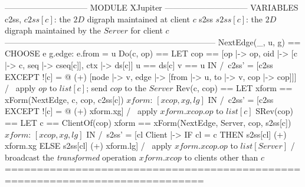 \documentclass[preview, border={5pt 0pt 5pt 1pt}]{standalone}
\begin{document}
\begin{tla}
------------------------------ MODULE XJupiter ------------------------------
VARIABLES c2ss, \* $c2ss[c]$: the $2D$ digraph maintained at client $c$ 
          s2ss  \* $s2ss[c]$: the $2D$ digraph maintained by the $Server$ for client $c$
-----------------------------------------------------------------------------
NextEdge(_, u, g) == CHOOSE e \in g.edge: e.from = u
Do(c, op) == LET cop == [op |-> op, oid |-> [c |-> c, seq |-> cseq[c]], ctx |-> ds[c]]
                   u == ds[c]    v == u 
             IN  /\ c2ss' = [c2ss EXCEPT ![c] =
                    @ (+) [node |-> {v}, 
                           edge |-> {[from |-> u, to |-> v, cop |-> cop]}]]
                 /\ \* apply $op$ to $list[c]$; send $cop$ to the $Server$
Rev(c, cop) == LET xform == xForm(NextEdge, c, cop, c2ss[c])
                   \*$xform$: $[xcop, xg, lg]$
               IN  /\ c2ss' = [c2ss EXCEPT ![c] = @ (+) xform.xg]
                   /\ \* apply $xform.xcop.op$ to $list[c]$
SRev(cop) == 
    LET c == ClientOf(cop)
    xform == xForm(NextEdge, Server, cop, s2ss[c]) \* $xform$: $[xcop, xg, lg]$
    IN  /\ s2ss' = [cl \in Client |-> IF cl = c THEN s2ss[cl] (+) xform.xg
                                                ELSE s2ss[cl] (+) xform.lg]
        /\ \* apply $xform.xcop.op$ to $list[Server]$
        /\ \* broadcast the \emph{transformed} operation $xform.xcop$ to clients other than $c$
=============================================================================
\end{tla}
\end{document}
